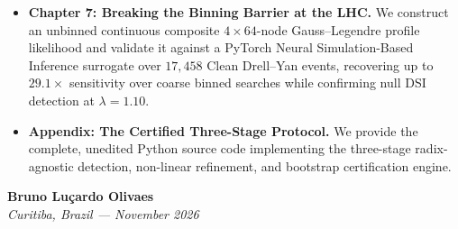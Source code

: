 \begin{itemize}
    \item \textbf{Chapter 7: Breaking the Binning Barrier at the LHC.} We construct an unbinned continuous composite $4 \times 64$-node Gauss--Legendre profile likelihood and validate it against a PyTorch Neural Simulation-Based Inference surrogate over $17,458$ Clean Drell--Yan events, recovering up to $29.1\times$ sensitivity over coarse binned searches while confirming null DSI detection at $\lambda = 1.10$.
    \item \textbf{Appendix: The Certified Three-Stage Protocol.} We provide the complete, unedited Python source code implementing the three-stage radix-agnostic detection, non-linear refinement, and bootstrap certification engine.
\end{itemize}

\vspace{0.8cm}
\noindent\textbf{Bruno Lu\c{c}ardo Olivaes}\\
\textit{Curitiba, Brazil --- November 2026}
